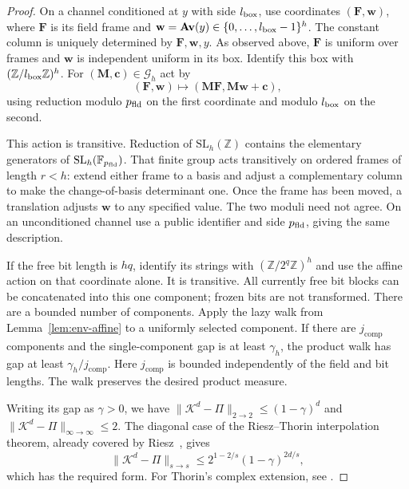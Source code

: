 \documentclass[11pt]{article}
\numberwithin{equation}{section}
\theoremstyle{definition}
\theoremstyle{remark}
\begin{document}
\begin{proof}
On a channel conditioned at $y$ with side ${l_{\rm box}}$, use coordinates
$({\mathbf{F}},{\mathbf{w}})$, where ${\mathbf{F}}$ is its field frame and
${\mathbf{w}}={\mathbf{A}}{\mathbf{v}}(y)\in\{0,\ldots,{l_{\rm box}}-1\}^{h}$. The constant column is uniquely
determined by ${\mathbf{F}},{\mathbf{w}},y$. As observed above, ${\mathbf{F}}$ is uniform over frames
and ${\mathbf{w}}$ is independent uniform in its box. Identify this box with
$(\mathbb Z/{l_{\rm box}}\mathbb Z)^{h}$.
For $({\mathbf{M}},{\mathbf{c}})\in {\mathcal{G}}_{h}$ act by
\[
({\mathbf{F}},{\mathbf{w}})\longmapsto({\mathbf{M}}{\mathbf{F}},{\mathbf{M}}{\mathbf{w}}+{\mathbf{c}}),
\]
using reduction modulo ${p_{\rm fld}}$ on the first coordinate and modulo ${l_{\rm box}}$
on the second.

This action is transitive. Reduction of $\mathrm{SL}_{h}(\mathbb Z)$
contains the elementary generators of $\mathrm{SL}_{h}(\mathbb F_{p_{\rm fld}})$.
That finite group acts transitively on ordered frames of length
$r<{h}$: extend either frame to a basis and adjust a complementary
column to make the change-of-basis determinant one. Once the frame
has been moved, a translation adjusts ${\mathbf{w}}$ to any specified value.
The two moduli need not agree. On an unconditioned channel use a
public identifier and side ${p_{\rm fld}}$, giving the same description.

If the free bit length is ${h}q$, identify its strings with
$(\mathbb Z/2^q\mathbb Z)^{h}$ and use the affine action on that
coordinate alone. It is transitive. All currently free bit blocks
can be concatenated into this one component; frozen bits are not
transformed.
There are a bounded number of components. Apply the lazy walk from
Lemma~\ref{lem:env-affine} to a uniformly selected component.
If there are ${j}_{\mathrm{comp}}$ components and the single-component gap is
at least $\gamma_{h}$, the product walk has gap at least
$\gamma_{h}/{j}_{\mathrm{comp}}$. Here ${j}_{\mathrm{comp}}$ is bounded independently
of the field and bit lengths. The walk preserves the desired product
measure.

Writing its gap as $\gamma>0$, we have
$\|{\mathcal{K}}^d-\Pi\|_{2\to2}\le(1-\gamma)^d$ and
$\|{\mathcal{K}}^d-\Pi\|_{\infty\to\infty}\le2$.
The diagonal case of the Riesz--Thorin interpolation theorem, already
covered by Riesz~\cite[Theorems~II and~II$'$, p.~472]{Riesz1927}, gives
\[
\|{\mathcal{K}}^d-\Pi\|_{s\to s}
\le 2^{1-2/s}(1-\gamma)^{2d/s},
\]
which has the required form. For Thorin's complex extension, see
\cite[Introduction, \S0.1; Russian translation, pp.~43--45]{Thorin1948}.
\end{proof}
\end{document}
